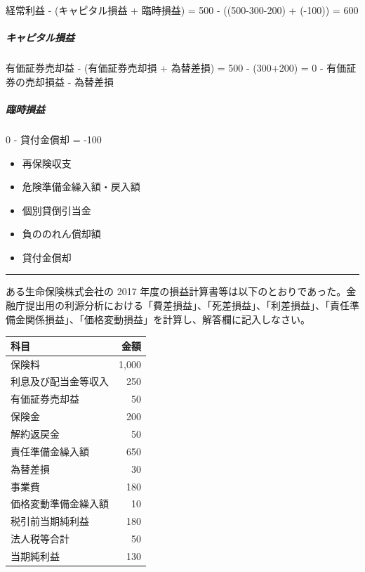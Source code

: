 \documentclass[report,gutter=10mm,fore-edge=10mm,uplatex,dvipdfmx]{jlreq}
\begin{document}
経常利益 - (キャピタル損益 + 臨時損益) = 500 - ((500-300-200) + (-100))
= 600

\subparagraph{キャピタル損益}

有価証券売却益 - (有価証券売却損 + 為替差損) = 500 - (300+200) = 0 -
有価証券の売却損益 - 為替差損

\subparagraph{臨時損益}

0 - 貸付金償却 = -100

\begin{itemize}
\tightlist
\item
  再保険収支
\item
  危険準備金繰入額・戻入額
\item
  個別貸倒引当金
\item
  負ののれん償却額
\item
  貸付金償却
\end{itemize}

\begin{center}\rule{0.5\linewidth}{0.5pt}\end{center}


ある生命保険株式会社の 2017
年度の損益計算書等は以下のとおりであった。金融庁提出用の利源分析における「費差損益」、「死差損益」、「利差損益」、「責任準備金関係損益」、「価格変動損益」を計算し、解答欄に記入しなさい。

\begin{tabular}{|l|r|}
\hline
科目 & 金額\\ \hline
保険料 & 1,000 \\ \hline
利息及び配当金等収入& 250 \\ \hline
有価証券売却益&50 \\ \hline
保険金&200\\ \hline
解約返戻金&50 \\ \hline
責任準備金繰入額&650 \\ \hline
為替差損&30 \\ \hline
事業費&180\\ \hline
価格変動準備金繰入額& 10\\ \hline
 税引前当期純利益&180\\ \hline
 法人税等合計&50\\ \hline 
当期純利益&130\\ \hline

\end{tabular}
\end{document}
